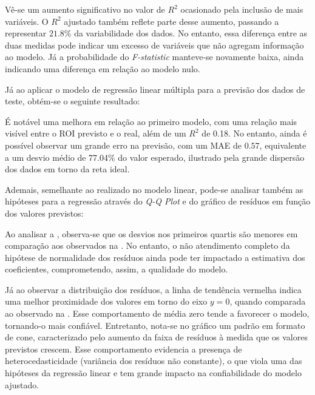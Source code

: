 %

Vê-se um aumento significativo no valor de $R^2$ ocasionado pela inclusão de mais variáveis. O $R^2$ ajustado também reflete parte desse aumento, passando a representar $21.8\%$ da variabilidade dos dados. No entanto, essa diferença entre as duas medidas pode indicar um excesso de variáveis que não agregam informação ao modelo. Já a probabilidade do \textit{F-statistic} manteve-se novamente baixa, ainda indicando uma diferença em relação ao modelo nulo.

Já ao aplicar o modelo de regressão linear múltipla para a previsão dos dados de teste, obtém-se o seguinte resultado:

%

É notável uma melhora em relação ao primeiro modelo, com uma relação mais visível entre o \acrshort{ROI} previsto e o real, além de um $R^2$ de 0.18. No entanto, ainda é possível observar um grande erro na previsão, com um \acrshort{MAE} de $0.57$, equivalente a um desvio médio de 77.04\% do valor esperado, ilustrado pela grande dispersão dos dados em torno da reta ideal.

Ademais, semelhante ao realizado no modelo linear, pode-se analisar também as hipóteses para a regressão através do \textit{Q-Q Plot} e do gráfico de resíduos em função dos valores previstos:

%

Ao analisar a , observa-se que os desvios nos primeiros quartis são menores em comparação aos observados na . No entanto, o não atendimento completo da hipótese de normalidade dos resíduos ainda pode ter impactado a estimativa dos coeficientes, comprometendo, assim, a qualidade do modelo.

%

Já ao observar a distribuição dos resíduos, a linha de tendência vermelha indica uma melhor proximidade dos valores em torno do eixo $y = 0$, quando comparada ao observado na . Esse comportamento de média zero tende a favorecer o modelo, tornando-o mais confiável. 
Entretanto, nota-se no gráfico um padrão em formato de cone, caracterizado pelo aumento da faixa de resíduos  à medida que os valores previstos crescem. Esse comportamento evidencia a presença de heterocedasticidade (variância dos resíduos não constante), o que viola uma das hipóteses da regressão linear e tem grande impacto na confiabilidade do modelo ajustado.

